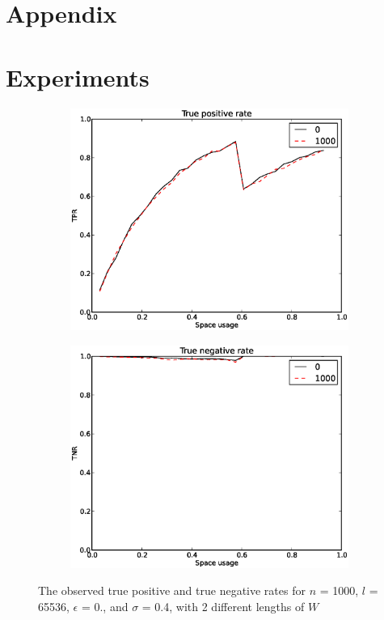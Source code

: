 \documentclass[a4paper,11pt]{article}
\begin{document}
\section*{Appendix}
\appendix
\section{Experiments}\label{appendix:experiments}
\begin{figure}[H]
\centering
\begin{subfigure}{.5\textwidth}
  \centering
  \includegraphics[width=.95\linewidth]{wildcard_1000_TPR1}
\end{subfigure}%
\begin{subfigure}{.5\textwidth}
  \centering
  \includegraphics[width=.95\linewidth]{wildcard_1000_TNR1}
\end{subfigure}
\caption{The observed true positive and true negative rates for $n$ = 1000, $l$ = 65536, $\epsilon$ = 0., and $\sigma$ = 0.4, with 2 different lengths of $W$}
\label{fig:w-tpnr}
\end{figure}

%
\end{document}

